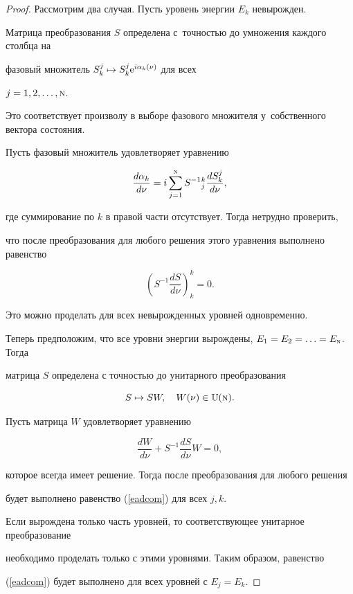 \begin{proof} Рассмотрим два случая. Пусть уровень энергии $E_k$ невырожден. 

Матрица преобразования $S$ определена с~точностью до умножения каждого столбца на

фазовый множитель $S_k^j\mapsto S_k^j{\rm e}^{i\alpha_k(\nu)}$ для всех

$j=1, 2, \dotsc,{\textsc{n}}$. 

Это соответствует произволу в выборе фазового множителя у~собственного вектора состояния. 

Пусть фазовый множитель удовлетворяет уравнению

\begin{equation*}

  \frac{d\alpha_k}{d\nu}=i\sum_{j=1}^{\textsc{n}} S^{-1}{}_j^k\frac{dS_k^j}{d\nu},

\end{equation*}

где суммирование по $k$ в правой части отсутствует. Тогда нетрудно проверить,

что после преобразования для любого решения этого уравнения выполнено равенство

\begin{equation}                                                  \label{ediael}

  \left(S^{-1}\frac{dS}{d\nu}\right)_k^k=0.

\end{equation}

Это можно проделать для всех невырожденных уровней одновременно.



Теперь предположим, что все уровни энергии вырождены, $E_1= E_2 =\dotsc=E_{\textsc{n}}$. Тогда

матрица $S$ определена с точностью до унитарного преобразования

\begin{equation*}

  S\mapsto SW,\quad W(\nu)\in{\mathbb U}({\textsc{n}}).

\end{equation*}

Пусть матрица $W$ удовлетворяет уравнению

\begin{equation*}

  \frac{dW}{d\nu}+S^{-1}\frac{dS}{d\nu}W=0,

\end{equation*}

которое всегда имеет решение. Тогда после преобразования для любого решения

будет выполнено равенство (\ref{eadcom}) для всех $j,k$.



Если вырождена только часть уровней, то соответствующее унитарное преобразование

необходимо проделать только с этими уровнями. Таким образом, равенство

(\ref{eadcom}) будет выполнено для всех уровней с $E_j=E_k$.

\end{proof}



